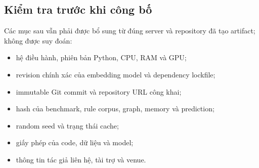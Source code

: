 \subsection{Kiểm tra trước khi công bố}

Các mục sau vẫn phải được bổ sung từ đúng server và repository đã tạo
artifact; không được suy đoán:

\begin{itemize}
    \item hệ điều hành, phiên bản Python, CPU, RAM và GPU;
    \item revision chính xác của embedding model và dependency lockfile;
    \item immutable Git commit và repository URL công khai;
    \item hash của benchmark, rule corpus, graph, memory và prediction;
    \item random seed và trạng thái cache;
    \item giấy phép của code, dữ liệu và model;
    \item thông tin tác giả liên hệ, tài trợ và venue.
\end{itemize}

